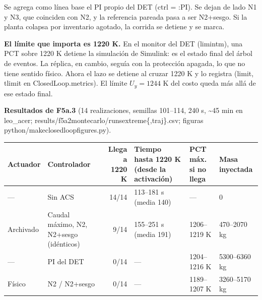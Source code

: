 \documentclass[11pt,a4paper]{article}
\newcommand{\codeus}{\textunderscore\allowbreak}
\newcommand{\code}[1]{{\small\ttfamily\let\_\codeus #1}}
\begin{document}
Se agrega como línea base el PI propio del DET (\code{ctrl = :PI}). Se dejan de lado N1 y N3, que coinciden con N2, y la referencia pareada pasa a ser N2+sesgo. Si la planta colapsa por inventario agotado, la corrida se detiene y se marca.

\textbf{El límite que importa es 1220 K.} En el monitor del DET (\code{limintm}), una PCT sobre 1220 K detiene la simulación de Simulink: es el estado final del árbol de eventos. La réplica, en cambio, seguía con la protección apagada, lo que no tiene sentido físico. Ahora el lazo se detiene al cruzar 1220 K y lo registra (\code{limit}, \code{t\_limit} en \code{ClosedLoop.metrics}). El límite $U_y=1244$ K del costo queda más allá de ese estado final.

\textbf{Resultados de F5a.3} (14 realizaciones, semillas 101–114, 240 s, \textasciitilde{}45 min en leo\_acer; \code{results/f5a2\_monte\_carlo/runs\_extreme\{,\_traj\}.csv}; figuras \code{python/make\_closed\_loop\_figures.py}).

{\footnotesize
\begin{xltabular}{\linewidth}{@{}YYRYYY@{}}
\toprule
\textbf{Actuador} & \textbf{Controlador} & \textbf{Llega a 1220 K} & \textbf{Tiempo hasta 1220 K (desde la activación)} & \textbf{PCT máx. si no llega} & \textbf{Masa inyectada} \\
\midrule
\endhead
— & Sin ACS & 14/14 & 113–181 s (media 140) & — & 0 \\
Archivado & Caudal máximo, N2, N2+sesgo (idénticos) & 9/14 & 155–251 s (media 191) & 1206–1219 K & 470–2070 kg \\
— & PI del DET & 0/14 & — & 1204–1216 K & 5300–6360 kg \\
Físico & N2 / N2+sesgo & 0/14 & — & 1189–1207 K & 3260–5170 kg \\
\bottomrule
\end{xltabular}}
\end{document}
